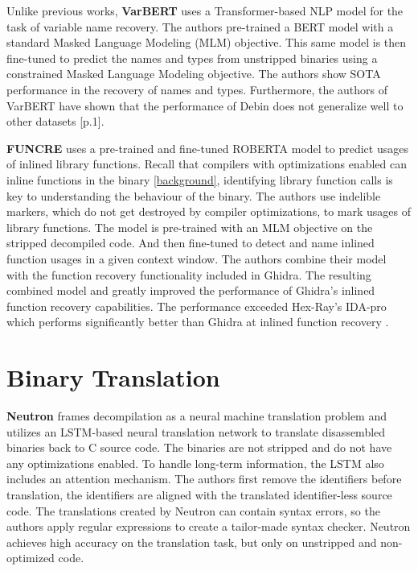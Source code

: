Unlike previous works, \textbf{VarBERT} \cite{VarBERT} uses a Transformer-based NLP model for the task of variable name recovery. The authors pre-trained a BERT model with a standard Masked Language Modeling (MLM) objective. This same model is then fine-tuned to predict the names and types from unstripped binaries using a constrained Masked Language Modeling objective. The authors show SOTA performance in the recovery of names and types. Furthermore, the authors of VarBERT have shown that the performance of Debin does not generalize well to other datasets \cite{VarBERT}[p.1]. 

\textbf{FUNCRE} \cite{FUNCRE} uses a pre-trained and fine-tuned ROBERTA model to predict usages of inlined library functions. Recall that compilers with optimizations enabled can inline functions in the binary \ref{background}, identifying library function calls is key to understanding the behaviour of the binary. The authors use indelible markers, which do not get destroyed by compiler optimizations, to mark usages of library functions. The model is pre-trained with an MLM objective on the stripped decompiled code. And then fine-tuned to detect and name inlined function usages in a given context window. The authors combine their model with the function recovery functionality included in Ghidra. The resulting combined model and greatly improved the performance of Ghidra's inlined function recovery capabilities. The performance exceeded Hex-Ray's IDA-pro which performs significantly better than Ghidra at inlined function recovery \cite{FUNCRE}. 

\section{Binary Translation}
\textbf{Neutron} \cite{Neutron} frames decompilation as a neural machine translation problem and utilizes an LSTM-based neural translation network to translate disassembled binaries back to C source code. The binaries are not stripped and do not have any optimizations enabled. To handle long-term information, the LSTM also includes an attention mechanism. The authors first remove the identifiers before translation, the identifiers are aligned with the translated identifier-less source code. The translations created by Neutron can contain syntax errors, so the authors apply regular expressions to create a tailor-made syntax checker. Neutron achieves high accuracy on the translation task, but only on unstripped and non-optimized code.

